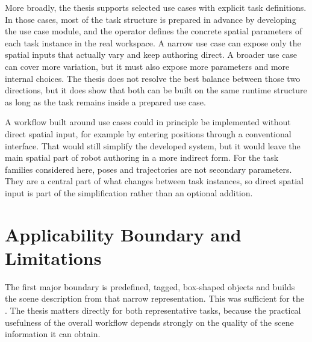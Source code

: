 More broadly, the thesis supports selected use cases with explicit task definitions\DIFdelbegin {}\DIFdelend . In those cases, most of the task structure is prepared in advance by developing the use case module, and the operator defines the concrete spatial parameters of each task instance in the real workspace. A narrow use case can expose only the spatial inputs that actually vary and keep authoring direct. A broader use case can cover more variation, but it must also expose more parameters and more internal choices. The thesis does not resolve the best balance between those two directions, but it does show that both can be built on the same runtime structure as long as the task remains inside a prepared use case\DIFdelbegin {}\DIFdelend \DIFaddbegin {}\DIFaddend .

A workflow built around use cases could in principle be implemented without direct spatial input, for example by entering positions through a conventional interface. That would still simplify \DIFaddbegin {}\DIFaddend the developed system, but it would leave the main spatial part of robot authoring in a more indirect form. For the task families considered here, poses and trajectories are not secondary parameters. They are a central part of what changes between task instances, so direct spatial input is part of the simplification rather than an optional addition.

\section{Applicability Boundary and Limitations}

The first major boundary is \DIFdelbegin {}\DIFdelend \DIFaddbegin {}\DIFaddend predefined, tagged, box-shaped objects and builds the scene description from that narrow representation. This was sufficient for the \DIFdelbegin {}\DIFdelend \DIFaddbegin {}\DIFaddend . The thesis \DIFdelbegin {}\DIFdelend \DIFaddbegin {}\DIFaddend matters directly for both representative tasks, because the practical usefulness of the overall workflow depends strongly on the quality \DIFaddbegin {}\DIFaddend of the scene information it can obtain.

